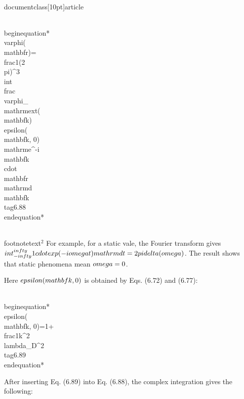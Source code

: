 \\documentclass[10pt]{article}
\begin{document}
{{{{\\begin{equation*}
\\varphi(\\mathbf{r})=\\frac{1}{(2 \\pi)^{3}} \\int \\frac{\\varphi_{\\mathrm{ext}}(\\mathbf{k})}{\\epsilon(\\mathbf{k}, 0)} \\mathrm{e}^{-i \\mathbf{k} \\cdot \\mathbf{r}} \\mathrm{d} \\mathbf{k} \\tag{6.88}
\\end{equation*}

\\footnotetext{${ }^{2}$ For example, for a static vale, the Fourier transform gives $\\int_{-\\infty}^{\\infty} 1 \\cdot \\exp (-i \\omega t) \\mathrm{d} t=2 \\pi \\delta(\\omega)$. The result shows that static phenomena mean $\\omega=0$.
}

Here $\\epsilon(\\mathbf{k}, 0)$ is obtained by Eqs. (6.72) and (6.77):


\\begin{equation*}
\\epsilon(\\mathbf{k}, 0)=1+\\frac{1}{k^{2} \\lambda_{D}^{2}} \\tag{6.89}
\\end{equation*}


After inserting Eq. (6.89) into Eq. (6.88), the complex integration gives the following:


}}}}
\end{document}
